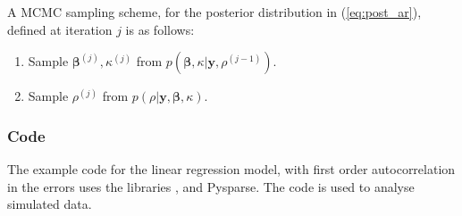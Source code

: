 \documentclass[article]{jss}
\begin{document}
A MCMC sampling scheme, for the posterior distribution in (\ref{eq:post_ar}),
defined at iteration $j$ is as follows: 
\begin{enumerate}
\item Sample $\bm{\beta}^{(j)},\kappa^{(j)}$ from $p(\bm{\beta},\kappa|\bm{y},\rho^{(j-1)}).$ 
\item Sample $\rho^{(j)}$ from $p(\rho|\bm{y},\bm{\beta},\kappa).$ 
\end{enumerate}

\subsubsection{Code}

The example code for the linear regression model, with first order
autocorrelation in the errors uses the  libraries
,  and Pysparse. The code is used to analyse
simulated data.
\end{document}
